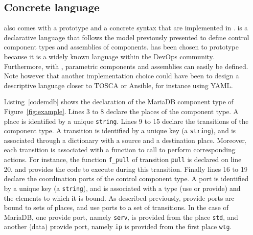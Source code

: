 
\subsection{Concrete language}

\mad also comes with a prototype and a concrete syntax that are
implemented in \python. \mad is a declarative language that follows
the model previously presented to define control component types and
assemblies of components. \python has been chosen to prototype \mad
because it is a widely known language within the DevOps
community. Furthermore, with \python, parametric components and
assemblies can easily be defined. Note however that another
implementation choice could have been to design a descriptive language
closer to TOSCA or Ansible, for instance using YAML.

Listing~\ref{codemdb} shows the declaration of the MariaDB component
type of Figure~\ref{fig:example}. Lines 3 to 8 declare the places of
the component type. A place is identified by a unique
\texttt{string}. Lines 9 to 15 declare the transitions of the
component type. A transition is identified by a unique key (a
\texttt{string}), and is associated through a dictionary with a source
and a destination place. Moreover, each transition is associated with
a function to call to perform corresponding actions. For instance, the
function \texttt{f\_pull} of transition \texttt{pull} is declared on
line 20, and provides the code to execute during this
transition. Finally lines 16 to 19 declare the coordination ports of
the control component type. A port is identified by a unique key (a
\texttt{string}), and is associated with a type (use or provide) and
the elements to which it is bound. As described previously, provide
ports are bound to sets of places, and use ports to a set of
transitions. In the case of MariaDB, one provide port, namely
\texttt{serv}, is provided from the place \texttt{std}, and
another (data) provide port, namely \texttt{ip} is provided from the
first place \texttt{wtg}.

